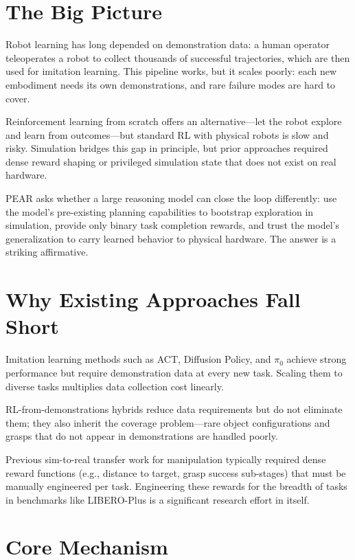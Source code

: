 \documentclass[10pt,twocolumn]{article}
\begin{document}
\section{The Big Picture}

Robot learning has long depended on demonstration data: a human operator teleoperates a robot to collect thousands of successful trajectories, which are then used for imitation learning.
This pipeline works, but it scales poorly: each new embodiment needs its own demonstrations, and rare failure modes are hard to cover.

Reinforcement learning from scratch offers an alternative---let the robot explore and learn from outcomes---but standard RL with physical robots is slow and risky.
Simulation bridges this gap in principle, but prior approaches required dense reward shaping or privileged simulation state that does not exist on real hardware.

PEAR asks whether a large reasoning model can close the loop differently: use the model's pre-existing planning capabilities to bootstrap exploration in simulation, provide only binary task completion rewards, and trust the model's generalization to carry learned behavior to physical hardware.
The answer is a striking affirmative.

\section{Why Existing Approaches Fall Short}

Imitation learning methods such as ACT, Diffusion Policy, and $\pi_0$ achieve strong performance but require demonstration data at every new task.
Scaling them to diverse tasks multiplies data collection cost linearly.

RL-from-demonstrations hybrids reduce data requirements but do not eliminate them; they also inherit the coverage problem---rare object configurations and grasps that do not appear in demonstrations are handled poorly.

Previous sim-to-real transfer work for manipulation typically required dense reward functions (e.g., distance to target, grasp success sub-stages) that must be manually engineered per task.
Engineering these rewards for the breadth of tasks in benchmarks like LIBERO-Plus is a significant research effort in itself.

\section{Core Mechanism}
\end{document}
